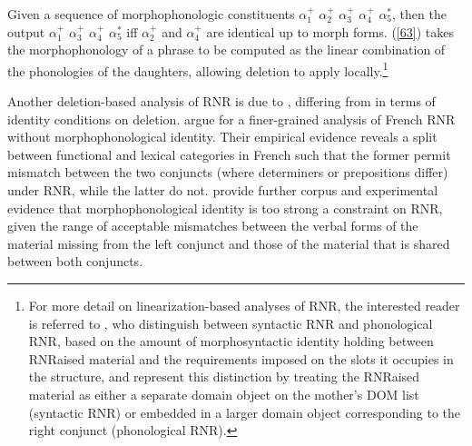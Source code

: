 {Given a sequence of morphophonologic constituents $\alpha_{1}^{+}$ $\alpha_{2}^{+}$ $\alpha_{3}^{+}$ $\alpha_{4}^{+}$ $\alpha_{5}^{*}$, then the output
$\alpha_{1}^{+}$ $\alpha_{3}^{+}$ $\alpha_{4}^{+}$ $\alpha_{5}^{*}$
iff $\alpha_{2}^{+}$ and $\alpha_{4}^{+}$ are identical up to morph forms.
\z
(\ref{63}) takes the morphophonology of a phrase to be computed as the linear combination of the phonologies of the daughters, allowing deletion to apply locally.\footnote{For more detail on linearization-based analyses of RNR, the interested reader is referred to \citet{Yatabe2001, Yatabe2012}, who distinguish between syntactic RNR and phonological RNR, based on the amount of morphosyntactic identity holding between RNRaised material and the requirements imposed on the slots it occupies in the structure, and represent this distinction by treating the RNRaised material as either a separate domain object on the mother's DOM list (syntactic RNR) or embedded in a larger domain object corresponding to the right conjunct (phonological RNR).}



\iffalse{
\citeauthor{Chaves2014}' (\citeyear[874]{Chaves2014}) constraint licensing true RNR is given in \ref{bpd}. It permits the M(orpho)P(honology) feature of the mother to contain only one instance (represented as $L_{3}$ in (\ref{63})) of the two morphophonologically identical sequences [FORM $F_{1}$], \ldots, [FORM $F_{n}$] present in the daughters; the leftmost of these sequences undergoes deletion. The final list in the mother, $L_{4}$, may be empty or nonempty, depending on whether RNRaised material is discontinuous.
%



\ea
\label{bpd}
Backward periphery deletion construction:\\
\avmtmp{\small
[\type*{phrase}
  mp $L_{1}$:\type{ne-list} $\bigcirc L_{2}$:\type{ne-list} $\bigcirc L_{3} \bigcirc L_{4}$ & ]
} $\to$
\avmtmp{
 [ \type*{phrase}
    mp $L_{1} \bigcirc$ < [ form $F_{1}$ ], \ldots, [ form $F_{n}$ ] > $\bigcirc L_{2} \bigcirc L_{3}:$%
     <[ form $F_{1}$ ], \ldots, [form $F_{n}$ ] > $\bigcirc L_{4}$ & ]
}
\z
}\fi

Another deletion-based analysis of RNR is due to \citep{Abeille2016, Shiraishi2019}, differing from \citet{Chaves2014} in terms of identity conditions on deletion. \citet{Abeille2016} argue for a finer-grained analysis of French RNR without morphophonological identity. Their empirical evidence reveals a split between functional and lexical categories in French such that the former permit mismatch between the two conjuncts (where determiners or prepositions differ) under RNR, while the latter do not. \citet{Shiraishi2019} provide further corpus and experimental evidence that morphophonological identity is too strong a constraint on RNR, given the range of acceptable mismatches between the verbal forms of the material missing from the left conjunct and those of the material that is shared between both conjuncts.

}
